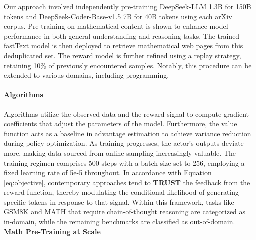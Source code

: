 Our approach involved independently pre-training DeepSeek-LLM 1.3B for 150B tokens and DeepSeek-Coder-Base-v1.5 7B for 40B tokens using each arXiv corpus. Pre-training on mathematical content is shown to enhance model performance in both general understanding and reasoning tasks. The trained fastText model is then deployed to retrieve mathematical web pages from this deduplicated set. The reward model is further refined using a replay strategy, retaining 10\% of previously encountered samples. Notably, this procedure can be extended to various domains, including programming. \paragraph{Algorithms} Algorithms utilize the observed data and the reward signal to compute gradient coefficients that adjust the parameters of the model. Furthermore, the value function acts as a baseline in advantage estimation to achieve variance reduction during policy optimization. As training progresses, the actor's outputs deviate more, making data sourced from online sampling increasingly valuable. The training regimen comprises 500 steps with a batch size set to 256, employing a fixed learning rate of 5e-5 throughout. In accordance with Equation \ref{eq:objective}, contemporary approaches tend to \textbf{TRUST} the feedback from the reward function, thereby modulating the conditional likelihood of generating specific tokens in response to that signal. Within this framework, tasks like GSM8K and MATH that require chain-of-thought reasoning are categorized as in-domain, while the remaining benchmarks are classified as out-of-domain. \textbf{Math Pre-Training at Scale}

